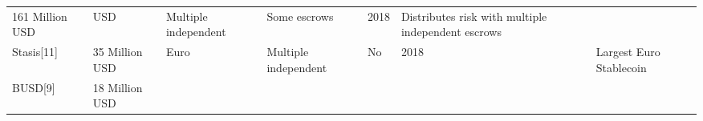 \documentclass[english,]{IEEEtran}
\begin{document}
\begin{longtable}[]{@{}lllllll@{}}
\begin{minipage}[t]{0.08\columnwidth}
161 Million USD\strut
\end{minipage} & \begin{minipage}[t]{0.08\columnwidth}\raggedright\strut
USD\strut
\end{minipage} & \begin{minipage}[t]{0.10\columnwidth}\raggedright\strut
Multiple independent\strut
\end{minipage} & \begin{minipage}[t]{0.08\columnwidth}\raggedright\strut
Some escrows\strut
\end{minipage} & \begin{minipage}[t]{0.04\columnwidth}\raggedright\strut
2018\strut
\end{minipage} & \begin{minipage}[t]{0.30\columnwidth}\raggedright\strut
Distributes risk with multiple independent escrows\strut
\end{minipage}\tabularnewline
\begin{minipage}[t]{0.14\columnwidth}\raggedright\strut
Stasis{[}11{]}\strut
\end{minipage} & \begin{minipage}[t]{0.08\columnwidth}\raggedright\strut
35 Million USD\strut
\end{minipage} & \begin{minipage}[t]{0.08\columnwidth}\raggedright\strut
Euro\strut
\end{minipage} & \begin{minipage}[t]{0.10\columnwidth}\raggedright\strut
Multiple independent\strut
\end{minipage} & \begin{minipage}[t]{0.08\columnwidth}\raggedright\strut
No\strut
\end{minipage} & \begin{minipage}[t]{0.04\columnwidth}\raggedright\strut
2018\strut
\end{minipage} & \begin{minipage}[t]{0.30\columnwidth}\raggedright\strut
Largest Euro Stablecoin\strut
\end{minipage}\tabularnewline
\begin{minipage}[t]{0.14\columnwidth}\raggedright\strut
BUSD{[}9{]}\strut
\end{minipage} & \begin{minipage}[t]{0.08\columnwidth}\raggedright\strut
18 Million USD\strut
\end{minipage} & \begin{minipage}[t]{0.08\columnwidth}\raggedright\strut

\end{minipage}
\end{longtable}
\end{document}
